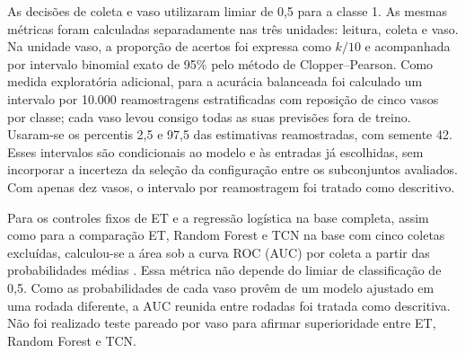 As decisões de coleta e vaso utilizaram limiar de
0,5 para a classe 1.
As mesmas métricas foram calculadas separadamente nas três unidades:
leitura, coleta e vaso. Na unidade vaso, a proporção de acertos foi
expressa como $k/10$ e acompanhada por intervalo binomial exato de
95\% pelo método de Clopper--Pearson. Como medida exploratória adicional,
para a acurácia balanceada foi calculado um intervalo por 10.000
reamostragens estratificadas com reposição de
cinco vasos por classe; cada vaso levou consigo todas as suas previsões
fora de treino. Usaram-se os percentis 2,5 e 97,5 das estimativas
reamostradas, com semente 42. Esses intervalos são condicionais ao modelo
e às entradas já escolhidas, sem incorporar a incerteza da seleção da
configuração entre os subconjuntos avaliados. Com apenas dez vasos, o
intervalo por reamostragem foi tratado como descritivo.

Para os controles fixos de ET e a regressão logística na base completa,
assim como para a comparação ET, Random Forest e TCN na base com cinco
coletas excluídas, calculou-se a área sob a curva ROC (AUC) por coleta a
partir das probabilidades médias%
. Essa métrica não depende do
limiar de classificação de 0,5. Como as probabilidades de cada vaso
provêm de um modelo ajustado em uma rodada diferente, a AUC reunida
entre rodadas foi tratada como descritiva. Não foi realizado teste pareado
por vaso para afirmar superioridade entre ET, Random Forest e TCN.

